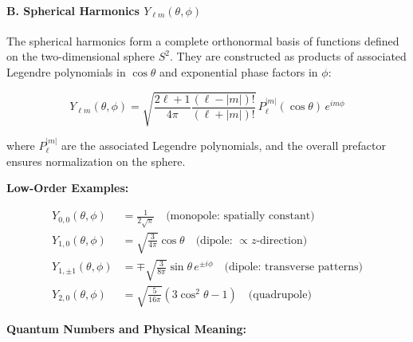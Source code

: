 \paragraph{B. Spherical Harmonics $Y_{\ell m}(\theta, \phi)$}

The spherical harmonics form a complete orthonormal basis of functions defined on the two-dimensional sphere $S^2$. They are constructed as products of associated Legendre polynomials in $\cos\theta$ and exponential phase factors in $\phi$:

\begin{equation}
Y_{\ell m}(\theta, \phi) = \sqrt{\frac{2\ell+1}{4\pi} \frac{(\ell-|m|)!}{(\ell+|m|)!}} \, P_\ell^{|m|}(\cos\theta) \, e^{im\phi}
\end{equation}

where $P_\ell^{|m|}$ are the associated Legendre polynomials, and the overall prefactor ensures normalization on the sphere.

\textbf{Low-Order Examples:}

\begin{align}
Y_{0,0}(\theta, \phi) &= \frac{1}{2\sqrt{\pi}} \quad \text{(monopole: spatially constant)} \\
Y_{1,0}(\theta, \phi) &= \sqrt{\frac{3}{4\pi}} \cos\theta \quad \text{(dipole: $\propto z$-direction)} \\
Y_{1,\pm 1}(\theta, \phi) &= \mp\sqrt{\frac{3}{8\pi}} \sin\theta \, e^{\pm i\phi} \quad \text{(dipole: transverse patterns)} \\
Y_{2,0}(\theta, \phi) &= \sqrt{\frac{5}{16\pi}} (3\cos^2\theta - 1) \quad \text{(quadrupole)}
\end{align}

\textbf{Quantum Numbers and Physical Meaning:}


